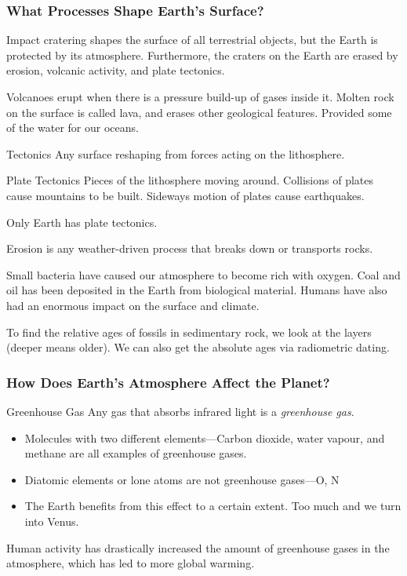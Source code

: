 \documentclass[class=article, crop=false]{standalone}
\begin{document}
  \subsubsection{What Processes Shape Earth's Surface?}
  Impact cratering shapes the surface of all terrestrial objects, but the Earth is protected by its atmosphere. Furthermore, the craters on the Earth are erased by erosion, volcanic activity, and plate tectonics. \par
  Volcanoes erupt when there is a pressure build-up of gases inside it. Molten rock on the surface is called lava, and erases other geological features. Provided some of the water for our oceans. \par
  \begin{definition}{Tectonics}
    Any surface reshaping from forces acting on the lithosphere.
  \end{definition}
  \begin{definition}{Plate Tectonics}
    Pieces of the lithosphere moving around. Collisions of plates cause mountains to be built. Sideways motion of plates cause earthquakes.
  \end{definition}
  \begin{note}{}
    Only Earth has plate tectonics.
  \end{note}
  Erosion is any weather-driven process that breaks down or transports rocks. \par
  Small bacteria have caused our atmosphere to become rich with oxygen. Coal and oil has been deposited in the Earth from biological material. Humans have also had an enormous impact on the surface and climate. \par
  To find the relative ages of fossils in sedimentary rock, we look at the layers (deeper means older). We can also get the absolute ages via radiometric dating.
  \subsubsection{How Does Earth's Atmosphere Affect the Planet?}
  \begin{definition}{Greenhouse Gas}
    Any gas that absorbs infrared light is a \emph{greenhouse gas}.
  \end{definition}
  \begin{itemize}
    \item Molecules with two different elements---Carbon dioxide, water vapour, and methane are all examples of greenhouse gases.
    \item Diatomic elements or lone atoms are not greenhouse gases---O, N
    \item The Earth benefits from this effect to a certain extent. Too much and we turn into Venus.
  \end{itemize}
  Human activity has drastically increased the amount of greenhouse gases in the atmosphere, which has led to more global warming.
\end{document}
